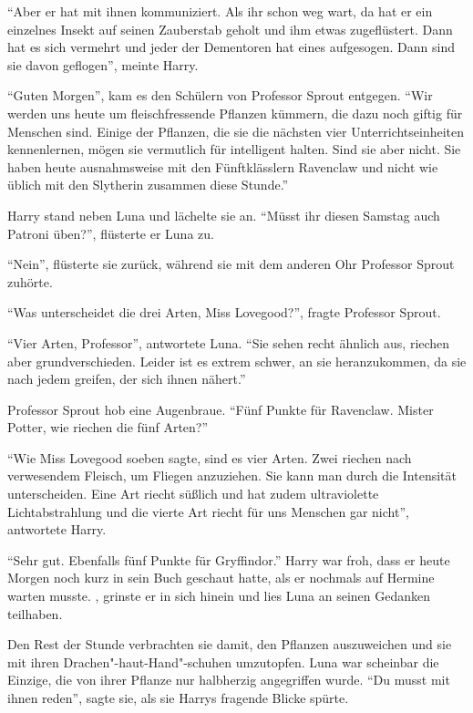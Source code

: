 \enquote{Aber er hat mit ihnen kommuniziert. Als ihr schon weg wart, da hat er ein einzelnes Insekt auf seinen Zauberstab geholt und ihm etwas zugeflüstert. Dann hat es sich vermehrt und jeder der Dementoren hat eines aufgesogen. Dann sind sie davon geflogen}, meinte Harry.

\enquote{Guten Morgen}, kam es den Schülern von Professor Sprout entgegen. \enquote{Wir werden uns heute um fleischfressende Pflanzen kümmern, die dazu noch giftig für Menschen sind. Einige der Pflanzen, die sie die nächsten vier Unterrichtseinheiten kennenlernen, mögen sie vermutlich für intelligent halten. Sind sie aber nicht. Sie haben heute ausnahmsweise mit den Fünftklässlern Ravenclaw und nicht wie üblich mit den Slytherin zusammen diese Stunde.}

Harry stand neben Luna und lächelte sie an. \enquote{Müsst ihr diesen Samstag auch Patroni üben?}, flüsterte er Luna zu.

\enquote{Nein}, flüsterte sie zurück, während sie mit dem anderen Ohr Professor Sprout zuhörte.

\enquote{Was unterscheidet die drei Arten, Miss Lovegood?}, fragte Professor Sprout.

\enquote{Vier Arten, Professor}, antwortete Luna. \enquote{Sie sehen recht ähnlich aus, riechen aber grundverschieden. Leider ist es extrem schwer, an sie heranzukommen, da sie nach jedem greifen, der sich ihnen nähert.}

Professor Sprout hob eine Augenbraue. \enquote{Fünf Punkte für Ravenclaw. \gst Mister Potter, wie riechen die fünf Arten?}

\enquote{Wie Miss Lovegood soeben sagte, sind es vier Arten. Zwei riechen nach verwesendem Fleisch, um Fliegen anzuziehen. Sie kann man durch die Intensität unterscheiden. Eine Art riecht süßlich und hat zudem ultraviolette Lichtabstrahlung und die vierte Art riecht für uns Menschen gar nicht}, antwortete Harry.

\enquote{Sehr gut. Ebenfalls fünf Punkte für Gryffindor.} Harry war froh, dass er heute Morgen noch kurz in sein Buch geschaut hatte, als er nochmals auf Hermine warten musste. , grinste er in sich hinein und lies Luna an seinen Gedanken teilhaben.

Den Rest der Stunde verbrachten sie damit, den Pflanzen auszuweichen und sie mit ihren Drachen"-haut-Hand"-schuhen umzutopfen. Luna war scheinbar die Einzige, die von ihrer Pflanze nur halbherzig angegriffen wurde. \enquote{Du musst mit ihnen reden}, sagte sie, als sie Harrys fragende Blicke spürte.




